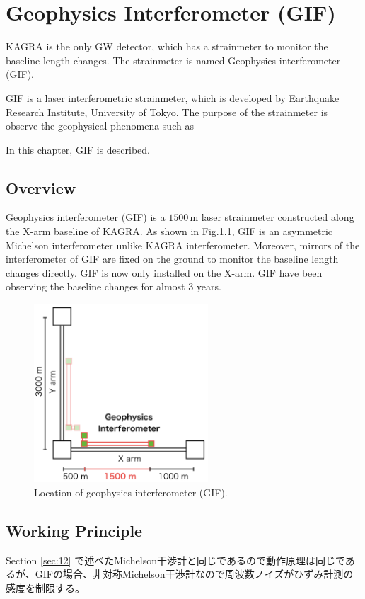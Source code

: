 \chapter{Geophysics Interferometer (GIF)}
KAGRA is the only GW detector, which has a strainmeter to monitor the baseline length changes. The strainmeter is named Geophysics interferometer (GIF).

GIF is a laser interferometric strainmeter, which is developed by Earthquake Research Institute, University of Tokyo. The purpose of the strainmeter is observe the geophysical phenomena such as 


In this chapter, GIF is described.

\section{Overview}
Geophysics interferometer (GIF) is a $1500\,\mathrm{m}$ laser strainmeter constructed along the X-arm baseline of KAGRA. As shown in Fig.\ref{img:img402}, GIF is an asymmetric Michelson interferometer unlike KAGRA interferometer. Moreover, mirrors of the interferometer of GIF are fixed on the ground to monitor the baseline length changes directly. GIF is now only installed on the X-arm. GIF have been observing the baseline changes for almost 3 years.
\begin{figure}[h]
  \centering
  \includegraphics[width=6.5cm]{./img_chap4/img402.png}
  \caption{Location of geophysics interferometer (GIF). } \label{img:img402}
\end{figure}


\section{Working Principle}
Section \cref{sec:12} で述べたMichelson干渉計と同じであるので動作原理は同じであるが、GIFの場合、非対称Michelson干渉計なので周波数ノイズがひずみ計測の感度を制限する。

